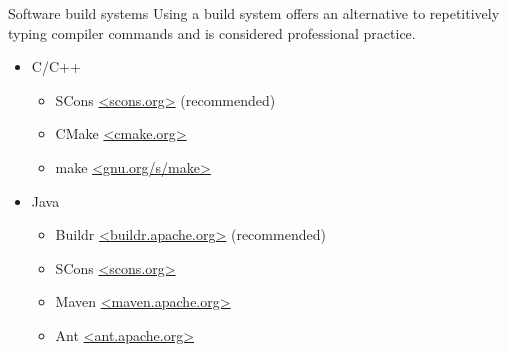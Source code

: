 \begin{block}{Software build systems}
  Using a build system offers an alternative to repetitively typing compiler commands and is considered professional practice.
  \begin{itemize}
  \item C/C++
    \begin{itemize}
    \item SCons \url{<scons.org>} (recommended)
    \item CMake \url{<cmake.org>}
    \item make \url{<gnu.org/s/make>}
    \end{itemize}
  \item Java
    \begin{itemize}
    \item Buildr \url{<buildr.apache.org>} (recommended)
    \item SCons \url{<scons.org>}
    \item Maven \url{<maven.apache.org>}
    \item Ant \url{<ant.apache.org>}
    \end{itemize}
  \end{itemize}
\end{block}
